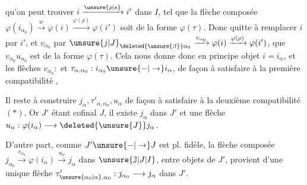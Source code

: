 
qu'on peut trouver $i\xrightarrow{\unsure{\rho|s}}i'$ dans $I$, tel que la flèche composée $\varphi(i_{\alpha_0})\xrightarrow{w}\varphi(i)\xrightarrow{\varphi(\rho)}\varphi(i')$
soit de la forme $\varphi(\tau)$. Donc quitte à remplacer $i$ par $i'$, et $v_{\alpha_0}$ par    $\unsure{j|J}_{\deleted{\unsure{\beta}}\alpha_0}\xrightarrow{v_{\alpha_0}}\varphi(i)\xrightarrow{\varphi(\rho)}\varphi(i')$, 
  que $v_{\alpha_0}u_{\alpha_0}$ est de la forme $\varphi(\tau)$. Cela nous donne donc en principe objet $i=i_\alpha$, et les flèches $v_{\alpha_0}:$  et $\tau_{\alpha,\alpha_0}:i_{\alpha_0}\unsure{-|\to}i_\alpha$, de façon à satisfaire à la première compatibilité  ,

Il reste à construire $j_\alpha,\tau'_{\alpha,\alpha_0},u_\alpha$ de façon à satisfaire à la deuxième compatibilité $(*)$. Or $J'$ étant cofinal  $J$, il existe $j_\alpha$ dans $J'$ et une flèche $u_\alpha:\varphi(i_\alpha)\longrightarrow\deleted{\unsure{J}}j_\alpha$.

D'autre part, comme $J'\unsure{-|\to}J$ est pl. fidèle, la flèche composée $j_{\alpha_0}\xrightarrow{v_{\alpha_0}}\varphi(i_\alpha)\xrightarrow{u_\alpha}j_\alpha$ dans $\unsure{\mathbb{J}|J|I}$, entre objets de $J'$, provient d'une unique flèche $\tau'_{\unsure{\alpha_0|\alpha},\alpha_0}:j_{\alpha_0}\longrightarrow j_\alpha$ dans $J'$.
